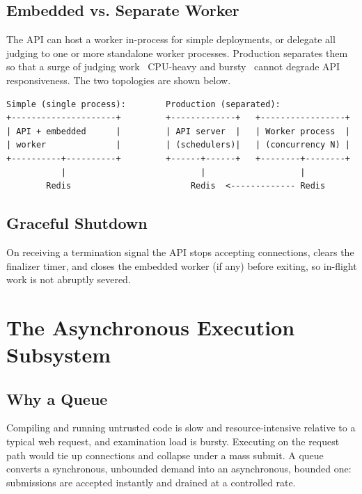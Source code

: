 \documentclass[12pt,a4paper,oneside]{report}
\begin{document}
\section{Embedded vs. Separate Worker}
The API can host a worker in-process for simple deployments, or delegate all
judging to one or more standalone worker processes. Production separates them so
that a surge of judging work \textemdash\ CPU-heavy and bursty \textemdash\
cannot degrade API responsiveness. The two topologies are shown below.

\begin{lstlisting}[language={}]
Simple (single process):        Production (separated):
+---------------------+         +-------------+   +-----------------+
| API + embedded      |         | API server  |   | Worker process  |
| worker              |         | (schedulers)|   | (concurrency N) |
+----------+----------+         +------+------+   +--------+--------+
           |                           |                   |
        Redis                        Redis  <------------- Redis
\end{lstlisting}

\section{Graceful Shutdown}
On receiving a termination signal the API stops accepting connections, clears the
finalizer timer, and closes the embedded worker (if any) before exiting, so
in-flight work is not abruptly severed.

\chapter{The Asynchronous Execution Subsystem}
\section{Why a Queue}
Compiling and running untrusted code is slow and resource-intensive relative to a
typical web request, and examination load is bursty. Executing on the request
path would tie up connections and collapse under a mass submit. A queue converts
a synchronous, unbounded demand into an asynchronous, bounded one: submissions
are accepted instantly and drained at a controlled rate.
\end{document}
